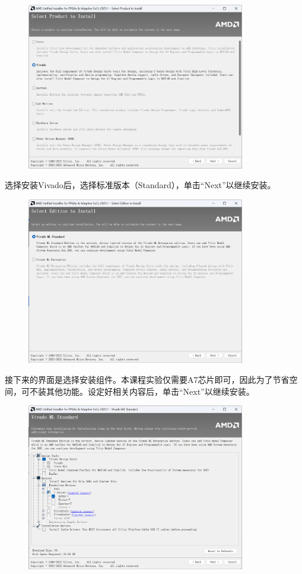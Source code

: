 \documentclass{ctexart}
\begin{document}
\begin{figure}[H]
    \centering
    \includegraphics[width=0.85\textwidth]{lab0/5.png}
\end{figure}

选择安装Vivado后，选择标准版本（Standard），单击“Next”以继续安装。

\begin{figure}[H]
    \centering
    \includegraphics[width=0.85\textwidth]{lab0/6.png}
\end{figure}

接下来的界面是选择安装组件。本课程实验仅需要A7芯片即可，因此为了节省空间，可不装其他功能。设定好相关内容后，单击“Next”以继续安装。

\begin{figure}[H]
    \centering
    \includegraphics[width=0.85\textwidth]{lab0/7.png}
\end{figure}
\end{document}
